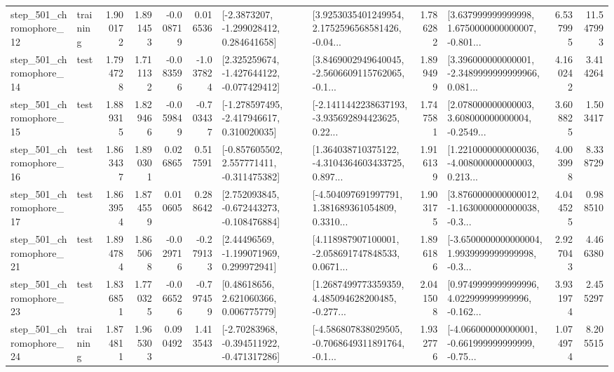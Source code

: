 \begin{tabular}{llrrrrllrlrr}
  step\_501\_chromophore\_12 &  training &      1.900172 &    1.891453 &     -0.008719 &  0.016536 &     [-2.3873207, -1.299028412, 0.284641658] &  [3.9253035401249954, 2.1752596568581426, -0.04... &       1.786282 &  [3.637999999999998, 1.6750000000000007, -0.801... &            6.537995 &         11.547993 \\
  step\_501\_chromophore\_14 &      test &      1.794728 &    1.711132 &     -0.083596 & -1.037824 &   [2.325259674, -1.427644122, -0.077429412] &  [3.8469002949640045, -2.5606609115762065, -0.1... &       1.899499 &  [3.396000000000001, -2.3489999999999966, 0.081... &            4.160242 &          3.414264 \\
  step\_501\_chromophore\_15 &      test &      1.889315 &    1.829466 &     -0.059849 & -0.703437 &   [-1.278597495, -2.417946617, 0.310020035] &  [-2.1411442238637193, -3.935692894423625, 0.22... &       1.747581 &  [2.078000000000003, 3.608000000000004, -0.2549... &            3.608825 &          1.503417 \\
  step\_501\_chromophore\_16 &      test &      1.863437 &    1.890301 &      0.026865 &  0.517591 &   [-0.857605502, 2.557771411, -0.311475382] &  [1.364038710375122, -4.3104364603433725, 0.897... &       1.916139 &  [1.2210000000000036, -4.008000000000003, 0.213... &            4.003998 &          8.338729 \\
  step\_501\_chromophore\_17 &      test &      1.863954 &    1.874559 &      0.010605 &  0.288642 &   [2.752093845, -0.672443273, -0.108476884] &  [-4.504097691997791, 1.381689361054809, 0.3310... &       1.903175 &  [3.8760000000000012, -1.1630000000000038, -0.3... &            4.044525 &          0.988510 \\
  step\_501\_chromophore\_21 &      test &      1.894784 &    1.865068 &     -0.029716 & -0.279133 &     [2.44496569, -1.199071969, 0.299972941] &  [4.118987907100001, -2.058691747848533, 0.0671... &       1.896186 &  [-3.6500000000000004, 1.9939999999999998, -0.3... &            2.927043 &          4.466380 \\
  step\_501\_chromophore\_23 &      test &      1.836851 &    1.770325 &     -0.066526 & -0.797459 &      [0.48618656, 2.621060366, 0.006775779] &  [1.2687499773359359, 4.485094628200485, -0.277... &       2.041508 &  [0.9749999999999996, 4.022999999999996, -0.162... &            3.931974 &          2.455297 \\
  step\_501\_chromophore\_24 &  training &      1.874811 &    1.965303 &      0.090492 &  1.413543 &   [-2.70283968, -0.394511922, -0.471317286] &  [-4.586807838029505, -0.7068649311891764, -0.1... &       1.932776 &  [-4.066000000000001, -0.661999999999999, -0.75... &            1.074974 &          8.205515 \\

\end{tabular}
